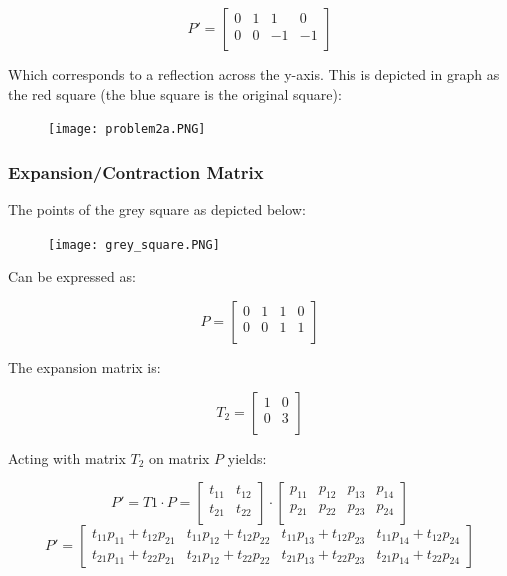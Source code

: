 \documentclass{article}
\begin{document}
\[P' = 
\begin{bmatrix}
    0 & 1 & 1 & 0 \\
    0 & 0 & -1 & -1 \\
\end{bmatrix}
\]

Which corresponds to a reflection across the y-axis. This is depicted in graph as the red square (the blue square is the original square):

\begin{figure}[!htb]
  \centering
  \texttt{[image: problem2a.PNG]}
  \label{fig3}
\end{figure}

\subsubsection*{Expansion/Contraction Matrix}

The points of the grey square as depicted below:

\begin{figure}[!htb]
  \centering
  \texttt{[image: grey\_square.PNG]}
  \label{fig3}
\end{figure}

Can be expressed as:

\[P = 
\begin{bmatrix}
    0 & 1 & 1 & 0 \\
    0 & 0 & 1 & 1 \\
\end{bmatrix}
\]

The expansion matrix is:

\[T_{2} = 
\begin{bmatrix}
    1 & 0  \\
    0 & 3  \\
\end{bmatrix}
\]

Acting with matrix $T_2$ on matrix $P$ yields:

\[ 
P' = T1 \cdot P = \begin{bmatrix}
t_{11} & t_{12} \\
t_{21} & t_{22} \\
\end{bmatrix} \cdot \begin{bmatrix}
p_{11} & p_{12} & p_{13} & p_{14} \\
p_{21} & p_{22} & p_{23} & p_{24} \\
\end{bmatrix}
\]
\[P' =  
\begin{bmatrix}
    t_{11}p_{11} + t_{12}p_{21} & t_{11}p_{12} + t_{12}p_{22} & t_{11}p_{13} + t_{12}p_{23} & t_{11}p_{14} + t_{12}p_{24} \\
    t_{21}p_{11} + t_{22}p_{21} & t_{21}p_{12} + t_{22}p_{22} & t_{21}p_{13} + t_{22}p_{23} & t_{21}p_{14} + t_{22}p_{24}
\end{bmatrix}
\]
\end{document}
